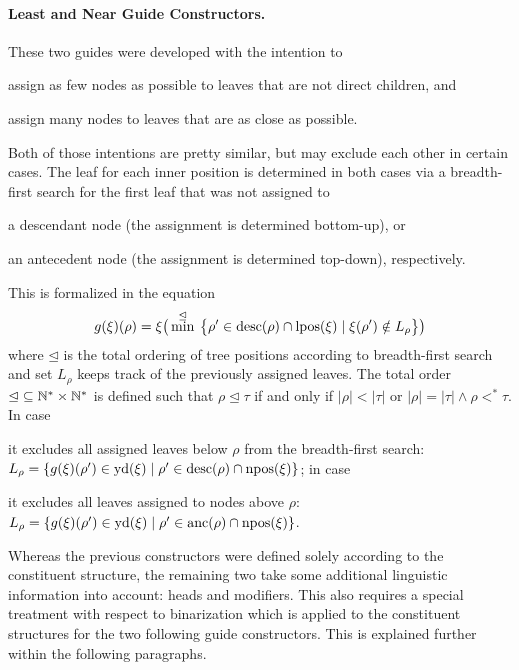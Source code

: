 \documentclass[../document.tex]{subfiles}
\begin{document}
    \paragraph{Least and Near Guide Constructors.}
    These two guides were developed with the intention to
    \begin{inparaenum}
        \item assign as few nodes as possible to leaves that are not direct children, and
        \item assign many nodes to leaves that are as close as possible.
    \end{inparaenum}
    Both of those intentions are pretty similar, but may exclude each other in certain cases.
    The leaf for each inner position is determined in both cases via a breadth-first search for the first leaf that was not assigned to
    \begin{inparaenum}
        \item a descendant node (the assignment is determined bottom-up), or
        \item an antecedent node (the assignment is determined top-down), respectively.
    \end{inparaenum}
    This is formalized in the equation
    \[
        g(\xi)(\rho) = \xi\big( \min^{\unlhd} \: \big\{\rho' \in \operatorname{desc}(\rho) \cap \operatorname{lpos}(\xi) \mid \xi(\rho') \notin L_\rho \big\} \big)
    \]
    where \(\unlhd\) is the total ordering of tree positions according to breadth-first search and set \(L_\rho\) keeps track of the previously assigned leaves.
    The total order \(\unlhd \subseteq \mathbb{N}^* \times \mathbb{N}^*\) is defined such that \(\rho \unlhd \tau\) if and only if \(|\rho| < |\tau|\) or \(|\rho| = |\tau| \land \rho <^* \tau\).
    In case
    \begin{inparaenum}
        \item it excludes all assigned leaves below \(\rho\) from the breadth-first search:
            \(L_\rho = \{ g(\xi)(\rho') \in \operatorname{yd}(\xi) \mid \rho' \in \operatorname{desc}(\rho) \cap \operatorname{npos}(\xi) \}\); in case
        \item it excludes all leaves assigned to nodes above \(\rho\):
            \(L_\rho = \{ g(\xi)(\rho') \in \operatorname{yd}(\xi) \mid \rho' \in \operatorname{anc}(\rho) \cap \operatorname{npos}(\xi) \}\).
    \end{inparaenum}

    Whereas the previous constructors were defined solely according to the constituent structure, the remaining two take some additional linguistic information into account: heads and modifiers.
    This also requires a special treatment with respect to binarization which is applied to the constituent structures for the two following guide constructors.
    This is explained further within the following paragraphs.
\end{document}
